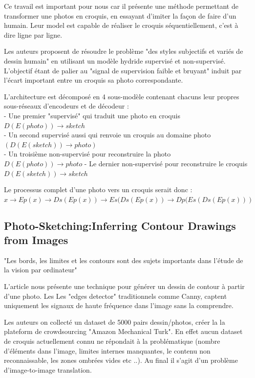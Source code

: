\documentclass[a4paper, 12pt]{book}
\begin{document}
Ce travail \cite{DBLP:journals/corr/abs-1805-00247} est important pour nous car il présente une méthode permettant de transformer une photos en croquis, en essayant d'imiter la façon de faire d'un humain. Leur model est capable de réaliser le croquis séquentiellement, c'est à dire ligne par ligne.
 
Les auteurs proposent de résoudre le problème "des styles subjectifs et variés de dessin humain" en utilisant un modèle hydride supervisé et non-supervisé. L'objectif étant de palier au "signal de supervision faible et bruyant" induit par l'écart important entre un croquis sa photo correspondante.

L'architecture est décomposé en 4 sous-modèle contenant chacuns leur propres sous-réseaux d'encodeurs et de décodeur : \\
- Une premier "supervisé" qui traduit une photo en croquis $D(E(photo))→sketch$ \\
- Un second supervisé aussi qui renvoie un croquis au domaine photo $(D(E(sketch))→photo)$ \\
- Un troisième non-supervisé pour reconstruire la photo $D(E(photo))→photo$
- Le dernier non-supervisé pour reconstruire le croquis $D(E(sketch))→sketch$

Le processus complet d'une photo vers un croquis serait donc : $x→Ep(x)→Ds(Ep(x))→Es(Ds(Ep(x))→Dp(Es(Ds(Ep(x)))$


\subsection{Photo-Sketching:Inferring Contour Drawings from Images}


"Les bords, les limites et les contours sont des sujets importants dans l’étude de la vision par ordinateur" \cite{DBLP:journals/corr/abs-1901-00542} 

L'article nous présente une technique pour générer un dessin de contour à partir d'une photo. Les Les "edges detector" traditionnels comme Canny, captent uniquement les signaux de haute fréquence dans l’image sans la comprendre. 

Les auteurs on collecté un dataset de 5000 pairs dessin/photos, créer la la plateform de crowdsourcing "Amazon Mechanical Turk". En effet aucun dataset de croquis actuellement connu ne répondait à la problématique (nombre d'éléments dans l'image, limites internes manquantes, le contenu non reconnaissable, les zones ombrées vides etc ..). Au final il s'agit d'un problème d'image-to-image translation. 
\end{document}
